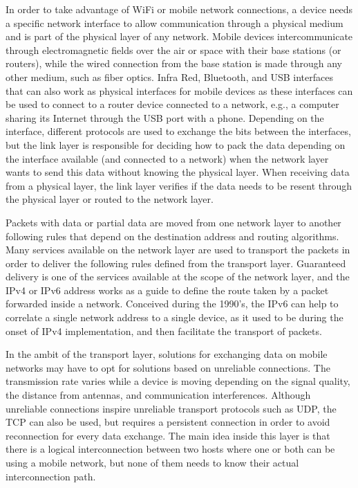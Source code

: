 In order to take advantage of WiFi or mobile network connections, a device needs a specific network interface to allow communication through a physical medium and is part of the physical layer of any network.
Mobile devices intercommunicate through electromagnetic fields over the air or space with their base stations (or routers), while the wired connection from the base station is made through any other medium, such as fiber optics.
Infra Red, Bluetooth, and USB interfaces that can also work as physical
interfaces for mobile devices as these interfaces can be used to connect to a router device connected to a network, e.g., a computer sharing its Internet through the USB port with a phone.
Depending on the interface, different protocols are used to exchange the bits between the interfaces, but the link layer is responsible for deciding how to pack the data depending on the interface available (and connected to a network) when the network layer wants to send this data without knowing the physical layer.
When receiving data from a physical layer, the link layer verifies if the data needs to be resent through the physical layer or routed to the network layer.

Packets with data or partial data are moved from one network layer to another following rules that depend on the destination address and routing algorithms.
Many services available on the network layer are used to transport the packets in order to deliver the following rules defined from the transport layer.
Guaranteed delivery is one of the services available at the scope of the network layer, and the IPv4 or IPv6 address works as a guide to define the route taken by a packet forwarded inside a network.
Conceived during the 1990's, the IPv6 can help to correlate a single network address to a single device, as it used to be during the onset of IPv4 implementation, and then facilitate the transport of packets.

In the ambit of the transport layer, solutions for exchanging data on mobile networks may have to opt for solutions based on unreliable connections.
The transmission rate varies while a device is moving depending on the signal quality, the distance from antennas, and communication interferences.
Although unreliable connections inspire unreliable transport protocols such as UDP, the TCP can also be used, but requires a persistent connection in order to avoid reconnection for every data exchange.
The main idea inside this layer is that there is a logical interconnection between two hosts where one or both can be using a mobile network, but none of them needs to know their actual interconnection path.

